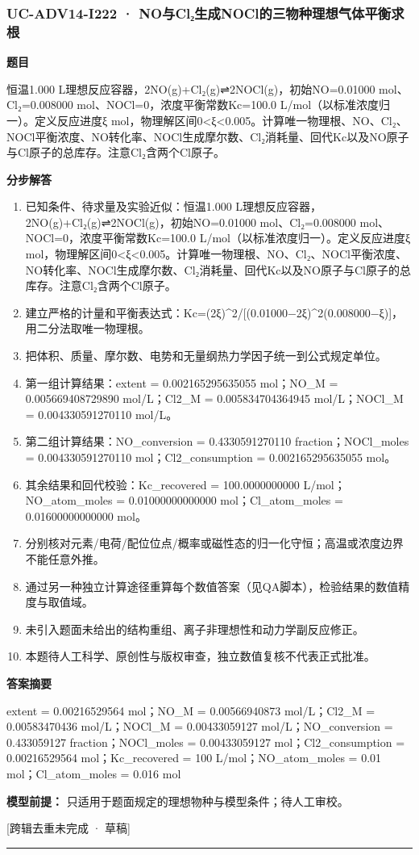 \documentclass[UTF8,11pt,a4paper]{ctexart}
\begin{document}
\subsubsection*{UC-ADV14-I222 · NO与Cl₂生成NOCl的三物种理想气体平衡求根}
\noindent\textbf{题目}\par
恒温1.000 L理想反应容器，2NO(g)+Cl₂(g)⇌2NOCl(g)，初始NO=0.01000 mol、Cl₂=0.008000 mol、NOCl=0，浓度平衡常数Kc=100.0 L/mol（以标准浓度归一）。定义反应进度ξ mol，物理解区间0<ξ<0.005。计算唯一物理根、NO、Cl₂、NOCl平衡浓度、NO转化率、NOCl生成摩尔数、Cl₂消耗量、回代Kc以及NO原子与Cl原子的总库存。注意Cl₂含两个Cl原子。\par
\medskip\noindent\textbf{分步解答}
\begin{enumerate}
\item 已知条件、待求量及实验近似：恒温1.000 L理想反应容器，2NO(g)+Cl₂(g)⇌2NOCl(g)，初始NO=0.01000 mol、Cl₂=0.008000 mol、NOCl=0，浓度平衡常数Kc=100.0 L/mol（以标准浓度归一）。定义反应进度ξ mol，物理解区间0<ξ<0.005。计算唯一物理根、NO、Cl₂、NOCl平衡浓度、NO转化率、NOCl生成摩尔数、Cl₂消耗量、回代Kc以及NO原子与Cl原子的总库存。注意Cl₂含两个Cl原子。
\item 建立严格的计量和平衡表达式：Kc=(2ξ)\textasciicircum{}2/[(0.01000−2ξ)\textasciicircum{}2(0.008000−ξ)]，用二分法取唯一物理根。
\item 把体积、质量、摩尔数、电势和无量纲热力学因子统一到公式规定单位。
\item 第一组计算结果：extent = 0.002165295635055 mol；NO\_M = 0.005669408729890 mol/L；Cl2\_M = 0.005834704364945 mol/L；NOCl\_M = 0.004330591270110 mol/L。
\item 第二组计算结果：NO\_conversion = 0.4330591270110 fraction；NOCl\_moles = 0.004330591270110 mol；Cl2\_consumption = 0.002165295635055 mol。
\item 其余结果和回代校验：Kc\_recovered = 100.0000000000 L/mol；NO\_atom\_moles = 0.01000000000000 mol；Cl\_atom\_moles = 0.01600000000000 mol。
\item 分别核对元素/电荷/配位位点/概率或磁性态的归一化守恒；高温或浓度边界不能任意外推。
\item 通过另一种独立计算途径重算每个数值答案（见QA脚本），检验结果的数值精度与取值域。
\item 未引入题面未给出的结构重组、离子非理想性和动力学副反应修正。
\item 本题待人工科学、原创性与版权审查，独立数值复核不代表正式批准。
\end{enumerate}
\noindent\textbf{答案摘要}\par
extent = 0.00216529564 mol；NO\_M = 0.00566940873 mol/L；Cl2\_M = 0.00583470436 mol/L；NOCl\_M = 0.00433059127 mol/L；NO\_conversion = 0.433059127 fraction；NOCl\_moles = 0.00433059127 mol；Cl2\_consumption = 0.00216529564 mol；Kc\_recovered = 100 L/mol；NO\_atom\_moles = 0.01 mol；Cl\_atom\_moles = 0.016 mol\par
\noindent\textbf{模型前提：}
只适用于题面规定的理想物种与模型条件；待人工审校。\par
\noindent\textcolor{red!65!black}{[跨辑去重未完成 · 草稿]} \par
\medskip\hrule\medskip
{}
\end{document}
